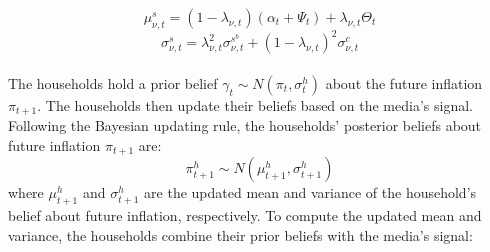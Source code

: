 \documentclass[review]{elsarticle}
\begin{document}
\begin{equation} 
\mu_{\nu,t}^s = (1-\lambda_{\nu,t}) (\alpha_t + \Psi_t) + \lambda_{\nu,t} \Theta_t 
\end{equation}
\begin{equation}
\sigma_{\nu,t}^s = \lambda_{\nu,t}^2 \sigma_{\nu,t}^{s^b} + (1- \lambda_{\nu,t})^2 \sigma^c_{\nu,t}
\end{equation}
\\
The households hold a prior belief $\gamma_t \sim N(\pi_t, \sigma^h_t)$ about the future inflation $\pi_{t+1}$. The households then update their beliefs based on the media's signal. Following the Bayesian updating rule, the households' posterior beliefs about future inflation $\pi_{t+1}$ are:
\begin{equation}
\pi_{t+1}^h \sim N(\mu^h_{t+1}, \sigma^h_{t+1})
\end{equation}
where $\mu^h_{t+1}$ and $\sigma^h_{t+1}$ are the updated mean and variance of the household's belief about future inflation, respectively. To compute the updated mean and variance, the households combine their prior beliefs with the media's signal:

%
\end{document}
